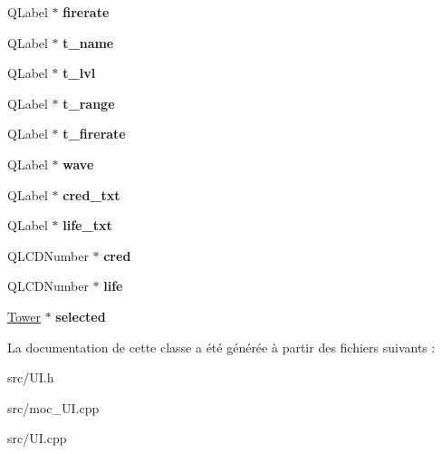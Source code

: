 \begin{DoxyCompactItemize}
\item 
\hypertarget{classUI_a58bde2e8f6ca9d8f2fa32affefa02045}{
QLabel $\ast$ {\bfseries firerate}}
\label{classUI_a58bde2e8f6ca9d8f2fa32affefa02045}

\item 
\hypertarget{classUI_a161fc86882aacdd0577fc8e65ae7b9a5}{
QLabel $\ast$ {\bfseries t\_\-name}}
\label{classUI_a161fc86882aacdd0577fc8e65ae7b9a5}

\item 
\hypertarget{classUI_ad249255ec54bc26253e0c215852a8eac}{
QLabel $\ast$ {\bfseries t\_\-lvl}}
\label{classUI_ad249255ec54bc26253e0c215852a8eac}

\item 
\hypertarget{classUI_a46e8137a64e79962e0ba633d4feb341f}{
QLabel $\ast$ {\bfseries t\_\-range}}
\label{classUI_a46e8137a64e79962e0ba633d4feb341f}

\item 
\hypertarget{classUI_aad8e7e7def9708c2b6e6511abb548b6d}{
QLabel $\ast$ {\bfseries t\_\-firerate}}
\label{classUI_aad8e7e7def9708c2b6e6511abb548b6d}

\item 
\hypertarget{classUI_a3f735d7d737b15dad131baf43b58eb17}{
QLabel $\ast$ {\bfseries wave}}
\label{classUI_a3f735d7d737b15dad131baf43b58eb17}

\item 
\hypertarget{classUI_a931c707005030131187d786b0966fc22}{
QLabel $\ast$ {\bfseries cred\_\-txt}}
\label{classUI_a931c707005030131187d786b0966fc22}

\item 
\hypertarget{classUI_a2f7c3ea7fc4e840270e989b0e68ec82b}{
QLabel $\ast$ {\bfseries life\_\-txt}}
\label{classUI_a2f7c3ea7fc4e840270e989b0e68ec82b}

\item 
\hypertarget{classUI_a1e6f0b63d2e4cb88476541452f81bd64}{
QLCDNumber $\ast$ {\bfseries cred}}
\label{classUI_a1e6f0b63d2e4cb88476541452f81bd64}

\item 
\hypertarget{classUI_a19d84baf49aecab7730ae12609b83be7}{
QLCDNumber $\ast$ {\bfseries life}}
\label{classUI_a19d84baf49aecab7730ae12609b83be7}

\item 
\hypertarget{classUI_af4edf19be15102c7aefb0e682c72c475}{
\hyperlink{classTower}{Tower} $\ast$ {\bfseries selected}}
\label{classUI_af4edf19be15102c7aefb0e682c72c475}

\end{DoxyCompactItemize}


La documentation de cette classe a été générée à partir des fichiers suivants :\begin{DoxyCompactItemize}
\item 
src/UI.h\item 
src/moc\_\-UI.cpp\item 
src/UI.cpp\end{DoxyCompactItemize}
